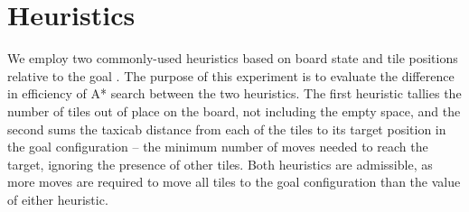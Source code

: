
\section{Heuristics}
\label{sec:background}

We employ two commonly-used heuristics based on board state and tile positions relative to the goal \cite{aima}.  The purpose of this experiment is to evaluate the difference in efficiency of A* search between the two heuristics.  The first heuristic tallies the number of tiles out of place on the board, not including the empty space, and the second sums the taxicab distance from each of the tiles to its target position in the goal configuration -- the minimum number of moves needed to reach the target, ignoring the presence of other tiles.  Both heuristics are admissible, as more moves are required to move all tiles to the goal configuration than the value of either heuristic.  